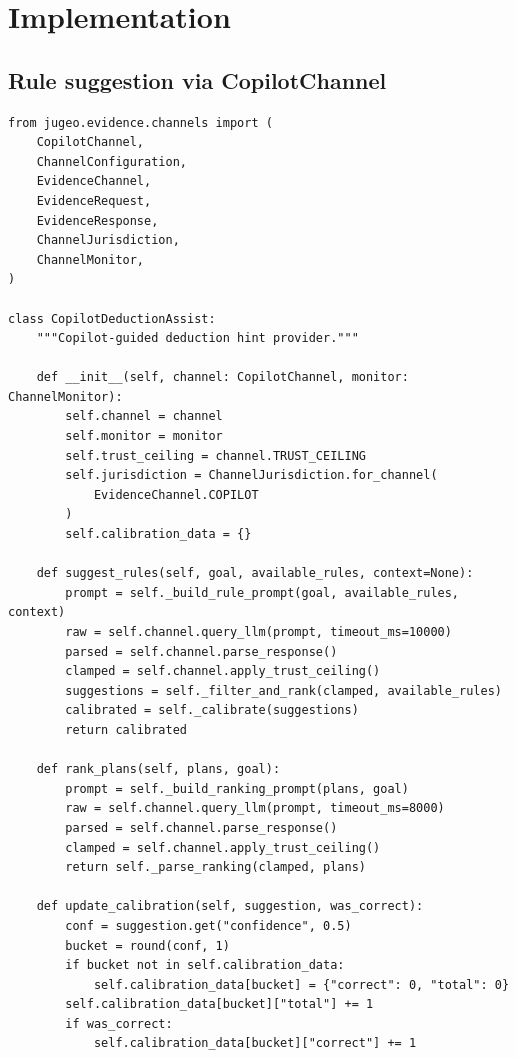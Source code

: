 \documentclass[11pt]{article}
\begin{document}
\section{Implementation}\label{sec:code}

\subsection{Rule suggestion via CopilotChannel}

\begin{lstlisting}[style=jugeo-python,
  caption={Deduction hint generation via CopilotChannel},
  label={lst:dedhint}]
from jugeo.evidence.channels import (
    CopilotChannel,
    ChannelConfiguration,
    EvidenceChannel,
    EvidenceRequest,
    EvidenceResponse,
    ChannelJurisdiction,
    ChannelMonitor,
)

class CopilotDeductionAssist:
    """Copilot-guided deduction hint provider."""

    def __init__(self, channel: CopilotChannel, monitor: ChannelMonitor):
        self.channel = channel
        self.monitor = monitor
        self.trust_ceiling = channel.TRUST_CEILING
        self.jurisdiction = ChannelJurisdiction.for_channel(
            EvidenceChannel.COPILOT
        )
        self.calibration_data = {}

    def suggest_rules(self, goal, available_rules, context=None):
        prompt = self._build_rule_prompt(goal, available_rules, context)
        raw = self.channel.query_llm(prompt, timeout_ms=10000)
        parsed = self.channel.parse_response()
        clamped = self.channel.apply_trust_ceiling()
        suggestions = self._filter_and_rank(clamped, available_rules)
        calibrated = self._calibrate(suggestions)
        return calibrated

    def rank_plans(self, plans, goal):
        prompt = self._build_ranking_prompt(plans, goal)
        raw = self.channel.query_llm(prompt, timeout_ms=8000)
        parsed = self.channel.parse_response()
        clamped = self.channel.apply_trust_ceiling()
        return self._parse_ranking(clamped, plans)

    def update_calibration(self, suggestion, was_correct):
        conf = suggestion.get("confidence", 0.5)
        bucket = round(conf, 1)
        if bucket not in self.calibration_data:
            self.calibration_data[bucket] = {"correct": 0, "total": 0}
        self.calibration_data[bucket]["total"] += 1
        if was_correct:
            self.calibration_data[bucket]["correct"] += 1


\end{lstlisting}
\end{document}
